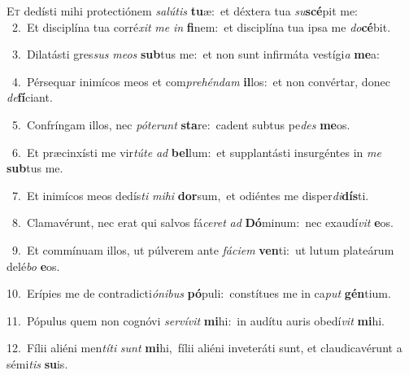 \lettrine{\initial\textcolor{\initialcolor}{E}}{t} dedísti mihi protectiónem \textit{sa}\-\textit{lú}\textit{tis} \textbf{tu}\-æ:~\star et déxtera tua \textit{su}\-\textbf{scé}pit me:\\
{\numbfont\textcolor{\numbcolor}{~2.}}~Et disciplína tua corré\textit{xit} \textit{me} \textit{in} \textbf{fi}\-nem:~\star et disciplína tua ipsa me \textit{do}\-\textbf{cé}bit.\par
{\numbfont\textcolor{\numbcolor}{~3.}}~Dilatásti gres\textit{sus} \textit{me}\-\textit{os} \textbf{sub}\-tus me:~\star et non sunt infirmáta vestígi\textit{a} \textbf{me}\-a:\par
{\numbfont\textcolor{\numbcolor}{~4.}}~Pérsequar inimícos meos et com\-\textit{pre}\-\textit{hén}\textit{dam} \textbf{il}\-los:~\star et non convértar, donec \textit{de}\-\textbf{fí}ciant.\par
{\numbfont\textcolor{\numbcolor}{~5.}}~Confríngam illos, nec \textit{pót}\-\textit{e}\textit{runt} \textbf{sta}\-re:~\star cadent subtus pe\textit{des} \textbf{me}\-os.\par
{\numbfont\textcolor{\numbcolor}{~6.}}~Et præcinxísti me vir\-\textit{tú}\-\textit{te} \textit{ad} \textbf{bel}\-lum:~\star et supplantásti insurgéntes in \textit{me} \textbf{sub}\-tus me.\par
{\numbfont\textcolor{\numbcolor}{~7.}}~Et inimícos meos dedís\textit{ti} \textit{mi}\-\textit{hi} \textbf{dor}\-sum,~\star et odiéntes me disper\-\textit{di}\-\textbf{dís}ti.\par
{\numbfont\textcolor{\numbcolor}{~8.}}~Clamavérunt, nec erat qui salvos fá\-\textit{ce}\-\textit{ret} \textit{ad} \textbf{Dó}\-minum:~\star nec exaudí\textit{vit} \textbf{e}\-os.\par
{\numbfont\textcolor{\numbcolor}{~9.}}~Et commínuam illos, ut púlverem ante \textit{fá}\-\textit{ci}\textit{em} \textbf{ven}\-ti:~\star ut lutum plateárum delé\textit{bo} \textbf{e}\-os.\par
{\numbfont\textcolor{\numbcolor}{10.}}~Erípies me de contradicti\-\textit{ó}\-\textit{ni}\textit{bus} \textbf{pó}\-puli:~\star constítues me in ca\textit{put} \textbf{gén}\-tium.\par
{\numbfont\textcolor{\numbcolor}{11.}}~Pópulus quem non cognóvi \textit{ser}\-\textit{ví}\textit{vit} \textbf{mi}\-hi:~\star in audítu auris obedí\textit{vit} \textbf{mi}\-hi.\par
{\numbfont\textcolor{\numbcolor}{12.}}~Fílii aliéni men\-\textit{tí}\-\textit{ti} \textit{sunt} \textbf{mi}\-hi,~\star fílii aliéni inveteráti sunt, et claudicavérunt a sémi\textit{tis} \textbf{su}\-is.\par
